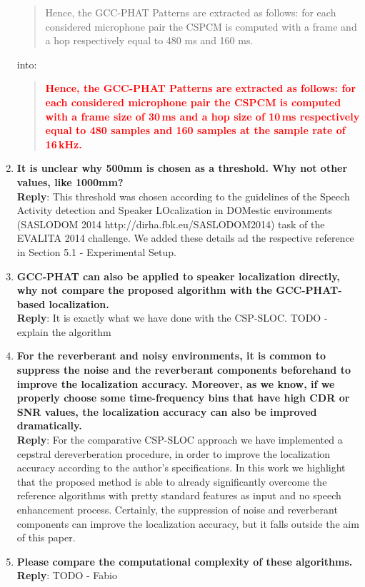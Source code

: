 \documentclass[11pt, technote, letterpaper, oneside, onecolumn]{IEEEtran}
\begin{document}
\begin{enumerate}
\begin{quote}
	Hence, the GCC-PHAT Patterns are extracted as follows: for each considered microphone pair the CSPCM is computed with a frame and a hop respectively equal to 480 ms and 160 ms.
\end{quote}
into:
\begin{quote}
	\textcolor{red}{\textbf{Hence, the GCC-PHAT Patterns are extracted as follows: for each considered microphone pair the CSPCM is computed with a frame size of 30\,ms and a hop size of 10\,ms respectively equal to 480 samples and 160 samples at the sample rate of 16\,kHz.}}
\end{quote}


\item  \textbf{It is unclear why 500mm is chosen as a threshold. Why not other values, like 1000mm?\\}
\textbf{Reply}: This threshold was chosen according to the guidelines of the Speech Activity detection and Speaker LOcalization in DOMestic environments (SASLODOM 2014 http://dirha.fbk.eu/SASLODOM2014) task of the EVALITA 2014 challenge. We added these details ad the respective reference in Section 5.1 - Experimental Setup.

\item  \textbf{GCC-PHAT can also be applied to speaker localization directly, why not compare the proposed algorithm with the GCC-PHAT-based localization. \\}
\textbf{Reply}:  It is exactly what we have done with the CSP-SLOC. TODO - explain the algorithm

\item  \textbf{For the reverberant and noisy environments, it is common to suppress the noise and the reverberant components beforehand to improve the localization accuracy. Moreover, as we know, if we properly choose some time-frequency bins that have high CDR or SNR values, the localization accuracy can also be improved dramatically.\\}
\textbf{Reply}: For the comparative CSP-SLOC approach we have implemented a cepstral dereverberation procedure, in order to improve the localization accuracy according to the author's specifications. In this work we highlight that the proposed method is able to already significantly overcome the reference algorithms with pretty standard features as input and no speech enhancement process. Certainly, the suppression of noise and reverberant components can improve the localization accuracy, but it falls outside the aim of this paper.

\item  \textbf{Please compare the computational complexity of these algorithms.\\}
\textbf{Reply}: TODO - Fabio

\end{enumerate}
\end{document}
